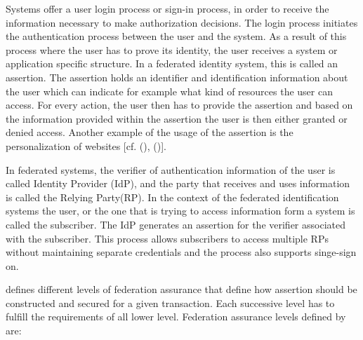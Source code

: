 Systems offer a user login process or sign-in process, in order to receive the information necessary to make authorization decisions. The login process initiates the authentication process between the user and the system. As a result of this process where the user has to prove its identity, the user receives a system or application specific structure. In a federated identity system, this is called an assertion. The assertion holds an identifier and identification information about the user which can indicate for example what kind of resources the user can access. For every action, the user then has to provide the assertion and based on the information provided within the assertion the user is then either granted or denied access. Another example of the usage of the assertion is the personalization of websites [cf. (\cite{Todorov:2007:MUI}), (\cite{NIST:2017:DIG})].

In federated systems, the verifier of authentication information of the user is called Identity Provider (IdP), and the party that receives and uses information is called the Relying Party(RP). In the context of the federated identification systems the user, or the one that is trying to access information form a system is called the subscriber. The IdP generates an assertion for the verifier associated with the subscriber. This process allows subscribers to access multiple RPs without maintaining separate credentials and the process also supports singe-sign on. \cite{NIST:2017:DIGFA}

\cite{NIST:2017:DIG} defines different levels of federation assurance that define how assertion should be constructed and secured for a given transaction. Each successive level has to fulfill the requirements of all lower level. Federation assurance levels defined by \cite{NIST:2017:DIGFA} are:

